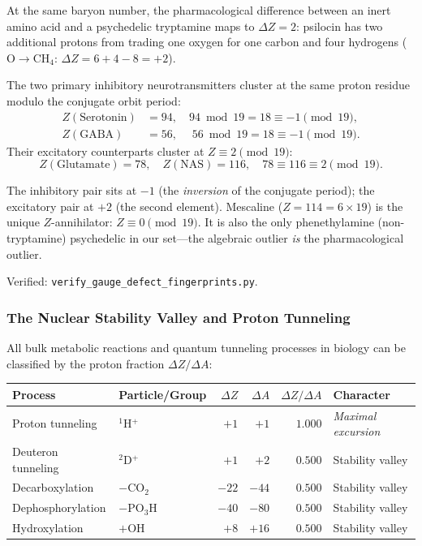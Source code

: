 At the same baryon number, the pharmacological difference between an inert amino acid and a psychedelic tryptamine maps to $\Delta Z = 2$: psilocin has two additional protons from trading one oxygen for one carbon and four hydrogens ($\text{O} \to \text{CH}_4$: $\Delta Z = 6 + 4 - 8 = +2$).

\begin{result}
\label{res:z_mod_19}
The two primary inhibitory neurotransmitters cluster at the same proton residue modulo the conjugate orbit period:
\begin{align}
  Z(\text{Serotonin}) &= 94, \quad 94 \bmod 19 = 18 \equiv -1 \pmod{19}, \\
  Z(\text{GABA}) &= 56, \quad\; 56 \bmod 19 = 18 \equiv -1 \pmod{19}.
\end{align}
Their excitatory counterparts cluster at $Z \equiv 2 \pmod{19}$:
\begin{equation}
  Z(\text{Glutamate}) = 78,\quad Z(\text{NAS}) = 116,\quad
  78 \equiv 116 \equiv 2 \pmod{19}.
\end{equation}
\end{result}

The inhibitory pair sits at $-1$ (the \emph{inversion} of the conjugate period); the excitatory pair at $+2$ (the second element). Mescaline ($Z = 114 = 6 \times 19$) is the unique $Z$-annihilator: $Z \equiv 0 \pmod{19}$. It is also the only phenethylamine (non-tryptamine) psychedelic in our set---the algebraic outlier \emph{is} the pharmacological outlier.

Verified: \texttt{verify\_gauge\_defect\_fingerprints.py}.

\subsubsection{The Nuclear Stability Valley and Proton Tunneling}

All bulk metabolic reactions and quantum tunneling processes in biology can be classified by the proton fraction $\Delta Z / \Delta A$:

\begin{center}
\begin{tabular}{@{}llrrrl@{}}
\toprule
\textbf{Process} & \textbf{Particle/Group} & $\Delta Z$ & $\Delta A$ & $\Delta Z / \Delta A$ & \textbf{Character} \\
\midrule
Proton tunneling       & ${}^1$H$^+$  & $+1$  & $+1$  & $1.000$ & \emph{Maximal excursion} \\
Deuteron tunneling     & ${}^2$D$^+$  & $+1$  & $+2$  & $0.500$ & Stability valley \\
Decarboxylation        & $-$CO$_2$    & $-22$ & $-44$ & $0.500$ & Stability valley \\
Dephosphorylation      & $-$PO$_3$H   & $-40$ & $-80$ & $0.500$ & Stability valley \\
Hydroxylation          & $+$OH        & $+8$  & $+16$ & $0.500$ & Stability valley \\
\bottomrule
\end{tabular}
\end{center}


